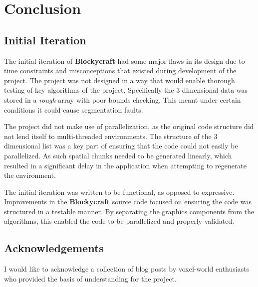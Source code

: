\documentclass{book}
\newcommand{\Blockycraft}{\textbf{Blockycraft}}
\begin{document}

\chapter{Conclusion}
\section{Initial Iteration}
The initial iteration of \Blockycraft{} had some major flaws in its design due to time constraints and misconceptions that existed during development of the project.  The project was not designed in a way that would enable thorough testing of key algorithms of the project.  Specifically the 3 dimensional data was stored in a \textit{rough} array with poor bounds checking.  This meant under certain conditions it could cause segmentation faults.   

The project did not make use of parallelization, as the original code structure did not lend itself to multi-threaded environments.  The structure of the 3 dimensional list was a key part of ensuring that the code could not easily be parallelized.  As such spatial chunks needed to be generated linearly, which resulted in a significant delay in the application when attempting to regenerate the environment.

The initial iteration was written to be functional, as opposed to expressive.  Improvements in the \Blockycraft{} source code focused on ensuring the code was structured in a testable manner.  By separating the graphics components from the algorithms, this enabled the code to be parallelized and properly validated.

\section{Acknowledgements}
I would like to acknowledge a collection of blog posts by voxel-world enthusiasts who provided the basis of understanding for the project.
\end{document}
